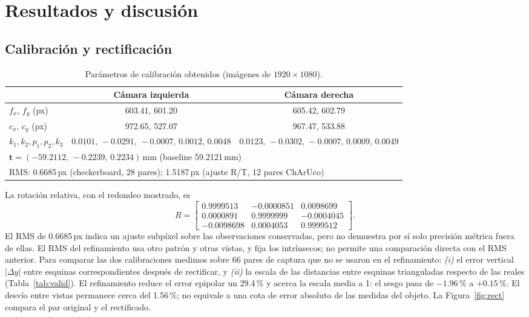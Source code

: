 \documentclass[10pt,a4paper]{article}
\begin{document}
\section{Resultados y discusión}

\subsection{Calibración y rectificación}

\begin{table}[!htb]
\centering\small
\begin{tabular}{lcc}
\toprule
 & Cámara izquierda & Cámara derecha\\
\midrule
$f_x,\,f_y$ (px) & 603.41, 601.20 & 605.42, 602.79\\
$c_x,\,c_y$ (px) & 972.65, 527.07 & 967.47, 533.88\\
$k_1,k_2,p_1,p_2,k_3$ & $0.0101,\,-0.0291,\,-0.0007,\,0.0012,\,0.0048$ & $0.0123,\,-0.0302,\,-0.0007,\,0.0009,\,0.0049$\\
\midrule
\multicolumn{3}{l}{$\mathbf{t} = (-59.2112,\,-0.2239,\,0.2234)$\,mm \quad (baseline 59.2121\,mm)}\\
\multicolumn{3}{l}{RMS: 0.6685\,px (checkerboard, 28 pares); 1.5187\,px (ajuste R/T, 12 pares ChArUco)}\\
\bottomrule
\end{tabular}
\caption{Parámetros de calibración obtenidos (imágenes de $1920\times1080$).}
\label{tab:calib}
\end{table}

La rotación relativa, con el redondeo mostrado, es
\[
R=\begin{bmatrix}
0.9999513 & -0.0000851 & 0.0098699\\
0.0000891 & 0.9999999 & -0.0004045\\
-0.0098698 & 0.0004053 & 0.9999512
\end{bmatrix}.
\]
El RMS de 0.6685\,px indica un ajuste subpíxel sobre las observaciones conservadas, pero
no demuestra por sí solo precisión métrica fuera de ellas. El RMS del refinamiento usa
otro patrón y otras vistas, y fija los intrínsecos; no permite una comparación directa
con el RMS anterior. Para comparar las dos calibraciones medimos sobre 66 pares de captura
que no se usaron en el refinamiento: \emph{(i)} el error vertical $|\Delta y|$ entre esquinas
correspondientes después de rectificar, y \emph{(ii)} la escala de las distancias entre esquinas
trianguladas respecto de las reales (Tabla~\ref{tab:valid}). El refinamiento reduce el error
epipolar un 29.4\,\% y acerca la escala media a 1: el sesgo pasa de $-1.96$\,\% a $+0.15$\,\%.
El desvío entre vistas permanece cerca del 1.56\,\%; no equivale a una cota de error absoluto
de las medidas del objeto. La Figura~\ref{fig:rect} compara el par original y el rectificado.
\end{document}
